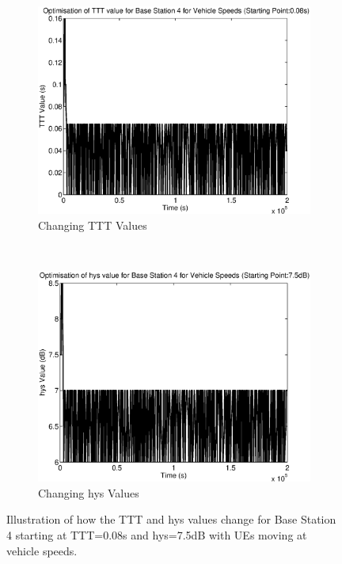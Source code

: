 \begin{figure}[H]
        \centering
        \begin{subfigure}[b]{0.49\textwidth}
                \includegraphics[width=\textwidth]{figures/graphs/vehhighhys/TTT4.eps}
                \caption{Changing TTT Values}
        \end{subfigure}%
        ~ %
        \begin{subfigure}[b]{0.49\textwidth}
                \includegraphics[width=\textwidth]{figures/graphs/vehhighhys/hys4.eps}
                \caption{Changing hys Values}
        \end{subfigure}
        \caption{Illustration of how the TTT and hys values change for Base Station 4 starting at TTT=0.08s and hys=7.5dB with UEs moving at vehicle speeds.}
\end{figure}
